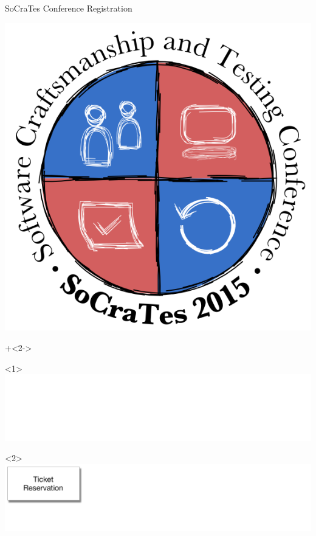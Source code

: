 \begin{frame}[fragile]{SoCraTes Conference Registration}

\begin{center}
\includegraphics[height=.4\textheight]{../SoCraTes_2015.png}
\end{center}

\vspace{2em}

\onslide+<2->
\begin{onlyenv}<1>
\includegraphics[width=\textwidth]{../Registration0.pdf}
\end{onlyenv}

\begin{onlyenv}<2>
\includegraphics[width=\textwidth]{../Registration1.pdf}
\end{onlyenv}


\end{frame}
